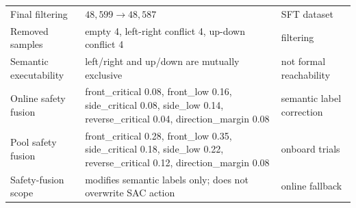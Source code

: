 \documentclass[11pt]{article}
\begin{document}
\begin{center}
\begin{tabularx}{\textwidth}{@{}Z Z Z@{}}
Final filtering & $48{,}599\rightarrow48{,}587$ & SFT dataset \\
Removed samples & empty 4, left-right conflict 4, up-down conflict 4 & filtering \\
Semantic executability & left/right and up/down are mutually exclusive & not formal reachability \\
Online safety fusion & front\_critical 0.08, front\_low 0.16, side\_critical 0.08, side\_low 0.14, reverse\_critical 0.04, direction\_margin 0.08 & semantic label correction \\
Pool safety fusion & front\_critical 0.28, front\_low 0.35, side\_critical 0.18, side\_low 0.22, reverse\_critical 0.12, direction\_margin 0.08 & onboard trials \\
Safety-fusion scope & modifies semantic labels only; does not overwrite SAC action & online fallback \\
\bottomrule
\end{tabularx}
\end{center}
\end{document}
